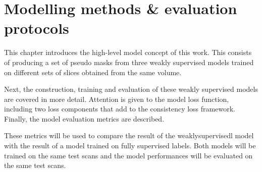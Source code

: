 


\chapter{Modelling methods \& evaluation protocols}\thispagestyle{empty}
\par{
    This chapter introduces the high-level model concept of this work.
    This consists of producing a set of pseudo masks from three weakly supervised models trained on different sets of slices obtained from the same volume.
}
\par{
    Next, the construction, training and evaluation of these weakly supervised models are covered in more detail.
    Attention is given to the model loss function, including two loss components that add to the consistency loss framework\cite{Laradji2021}.
    Finally, the model evaluation metrics are described.
}
\par{
    These metrics will be used to compare the result of the \Gls{weaklysupervisedl} model with the result of a model trained on fully supervised labels.
    Both models will be trained on the same test scans and the model performances will be evaluated on the same test scans.
}

\FloatBarrier



